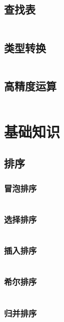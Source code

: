 \documentclass[a4paper,11pt]{article}
\begin{document}
\subsection{查找表}
\inputminted[linenos,autogobble]{java}{util/map.java}

\subsection{类型转换}
\inputminted[linenos,autogobble]{java}{util/convert.java}

\subsection{高精度运算}
\inputminted[linenos,autogobble]{java}{util/big.java}


\newpage
\section{基础知识}

\subsection{排序}

\subsubsection{冒泡排序}
\inputminted[linenos,autogobble]{java}{basic/sort/bubble.java}

\subsubsection{选择排序}
\inputminted[linenos,autogobble]{java}{basic/sort/select.java}

\subsubsection{插入排序} 
\inputminted[linenos,autogobble]{java}{basic/sort/insert.java}

\subsubsection{希尔排序} 
\inputminted[linenos,autogobble]{java}{basic/sort/shell.java}

\subsubsection{归并排序} 
\inputminted[linenos,autogobble]{java}{basic/sort/merge.java}
\end{document}
